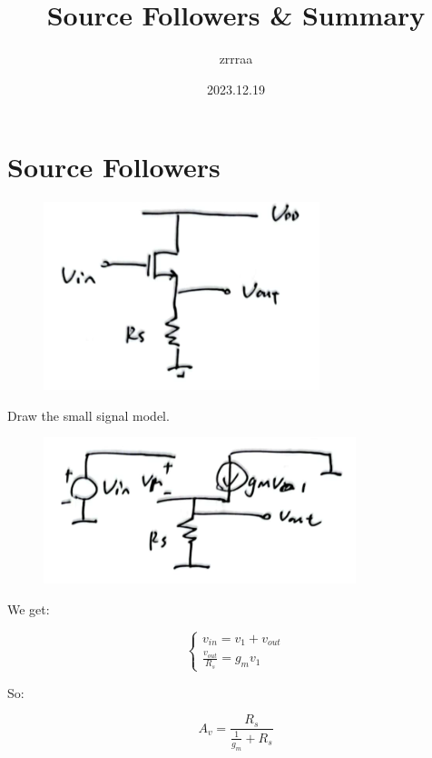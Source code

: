 \documentclass[fontset=windows]{article}
\title{\heiti\zihao{2} Source Followers \& Summary}
\author{\songti zrrraa}
\date{2023.12.19}
\begin{document}
\maketitle
\thispagestyle{empty}

\section*{Source Followers}

\begin{figure}[htbp]
    \centering
    \includegraphics[scale=0.8]{1.jpg}
    \captionsetup{labelformat=empty}
    \caption{}
    \label{1}
\end{figure}

Draw the small signal model. 

\begin{figure}[htbp]
    \centering
    \includegraphics[scale=0.8]{2.jpg}
    \captionsetup{labelformat=empty}
    \caption{}
    \label{2}
\end{figure}

We get: 

\begin{equation*}
    \begin{cases}
        v_{in}=v_1+v_{out} \\
        \frac{v_{out}}{R_s}=g_mv_1
    \end{cases}
\end{equation*}

So: 

$$A_v=\frac{R_s}{\frac{1}{g_m}+R_s}$$
\end{document}
